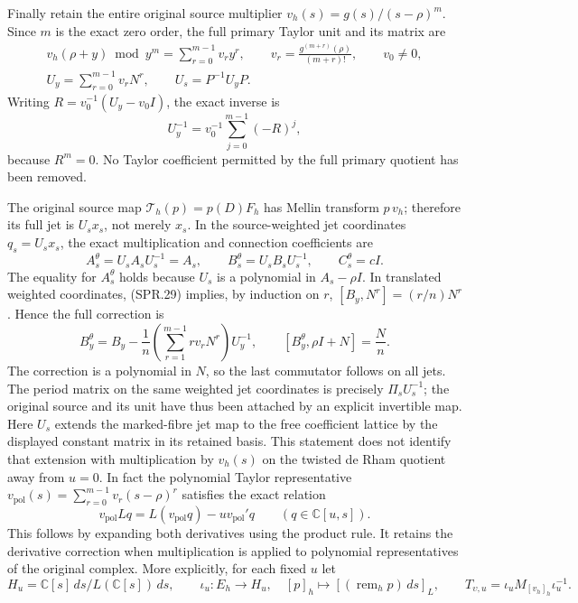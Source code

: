 Finally retain the entire original source multiplier
\(v_h(s)=g(s)/(s-\rho)^m\). Since \(m\) is the exact zero order,
the full primary Taylor unit and its matrix are
\[
 \begin{gathered}
 v_h(\rho+y)\bmod y^m
   =\sum_{r=0}^{m-1}v_r y^r,\qquad
 v_r=\frac{g^{(m+r)}(\rho)}{(m+r)!},\qquad v_0\ne0,\\
 U_y=\sum_{r=0}^{m-1}v_rN^r,\qquad U_s=P^{-1}U_yP.
 \end{gathered}
 \tag{SPR.30}
\]
Writing \(R=v_0^{-1}(U_y-v_0I)\), the exact inverse is
\[
 U_y^{-1}=v_0^{-1}\sum_{j=0}^{m-1}(-R)^j,
 \tag{SPR.31}
\]
because \(R^m=0\). No Taylor coefficient permitted by the full
primary quotient has been removed.

The original source map
\(\mathcal T_h(p)=p(D)F_h\) has Mellin transform \(p\,v_h\);
therefore its full jet is \(U_s x_s\), not merely \(x_s\).
In the source-weighted jet coordinates \(q_s=U_sx_s\),
the exact multiplication and connection coefficients are
\[
 A_s^\theta=U_sA_sU_s^{-1}=A_s,\qquad
 B_s^\theta=U_sB_sU_s^{-1},\qquad
 C_s^\theta=cI .
 \tag{SPR.32}
\]
The equality for \(A_s^\theta\) holds because \(U_s\) is a polynomial
in \(A_s-\rho I\). In translated weighted coordinates,
(SPR.29) implies, by induction on \(r\),
\([B_y,N^r]=(r/n)N^r\). Hence the full correction is
\[
 B_y^\theta
   =B_y-\frac1n
        \left(\sum_{r=1}^{m-1}r v_rN^r\right)U_y^{-1},
 \qquad
 [B_y^\theta,\rho I+N]=\frac Nn .
 \tag{SPR.33}
\]
The correction is a polynomial in \(N\), so the last commutator
follows on all jets. The period matrix on the same weighted jet
coordinates is precisely \(\Pi_sU_s^{-1}\); the original source
and its unit have thus been attached by an explicit invertible map.
Here \(U_s\) extends the marked-fibre jet map to the free coefficient
lattice by the displayed constant matrix in its retained basis.
This statement does not identify that extension with multiplication
by \(v_h(s)\) on the twisted de Rham quotient away from \(u=0\).
In fact the polynomial Taylor representative
\(v_{\mathrm{pol}}(s)=\sum_{r=0}^{m-1}v_r(s-\rho)^r\) satisfies
the exact relation
\[
 v_{\mathrm{pol}} Lq
   =L(v_{\mathrm{pol}}q)-u v_{\mathrm{pol}}'q
 \qquad(q\in\mathbb C[u,s]).
 \tag{SPR.34}
\]
This follows by expanding both derivatives using the product rule.
It retains the derivative correction when multiplication is applied
to polynomial representatives of the original complex.
More explicitly, for each fixed \(u\) let
\[
 H_u=\mathbb C[s]\,ds/L(\mathbb C[s])\,ds,\qquad
 \iota_u:E_h\longrightarrow H_u,\quad
 [p]_h\longmapsto[(\operatorname{rem}_h p)\,ds]_L,\qquad
 T_{\upsilon,u}=\iota_u M_{[v_h]_h}\iota_u^{-1}.
 \tag{SPR.35}
\]
